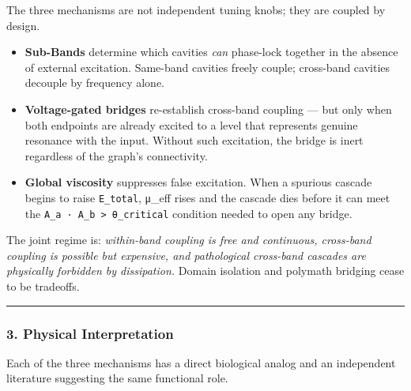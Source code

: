 \documentclass[
  11pt,
  a4paper,
]{article}
\providecommand{\tightlist}{%
  \setlength{\itemsep}{0pt}\setlength{\parskip}{0pt}}
\begin{document}
The three mechanisms are not independent tuning knobs; they are coupled
by design.

\begin{itemize}
\tightlist
\item
  \textbf{Sub-Bands} determine which cavities \emph{can} phase-lock
  together in the absence of external excitation. Same-band cavities
  freely couple; cross-band cavities decouple by frequency alone.
\item
  \textbf{Voltage-gated bridges} re-establish cross-band coupling ---
  but only when both endpoints are already excited to a level that
  represents genuine resonance with the input. Without such excitation,
  the bridge is inert regardless of the graph's connectivity.
\item
  \textbf{Global viscosity} suppresses false excitation. When a spurious
  cascade begins to raise \texttt{E\_total}, μ\_eff rises and the
  cascade dies before it can meet the
  \texttt{A\_a\ ·\ A\_b\ \textgreater{}\ θ\_critical} condition needed
  to open any bridge.
\end{itemize}

The joint regime is: \emph{within-band coupling is free and continuous,
cross-band coupling is possible but expensive, and pathological
cross-band cascades are physically forbidden by dissipation.} Domain
isolation and polymath bridging cease to be tradeoffs.

\begin{center}\rule{0.5\linewidth}{0.5pt}\end{center}

\subsubsection{3. Physical
Interpretation}\label{physical-interpretation}

Each of the three mechanisms has a direct biological analog and an
independent literature suggesting the same functional role.
\end{document}
